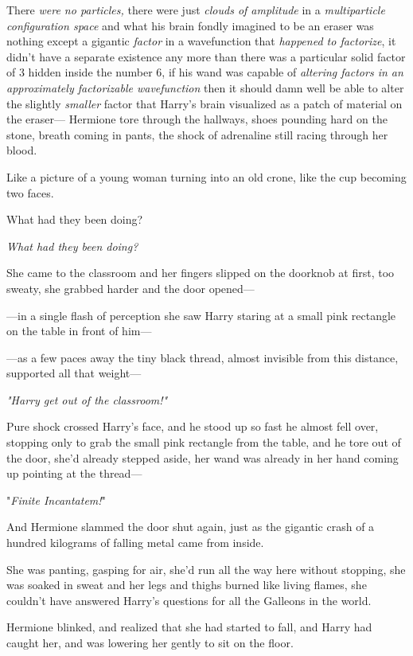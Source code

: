 There\emph{ were no particles,} there were just \emph{clouds of amplitude} in a 
\emph{multiparticle configuration space} and what his brain fondly imagined to 
be an eraser was nothing except a gigantic \emph{factor} in a wavefunction that 
\emph{happened to factorize}, it didn't have a separate existence any more than 
there was a particular solid factor of 3 hidden inside the number 6, if his 
wand was capable of \emph{altering factors in an approximately factorizable 
wavefunction} then it should damn well be able to alter the slightly 
\emph{smaller} factor that Harry's brain visualized as a patch of material on 
the eraser---
\sbreak
Hermione tore through the hallways, shoes pounding hard on the stone, breath 
coming in pants, the shock of adrenaline still racing through her blood.

Like a picture of a young woman turning into an old crone, like the cup 
becoming two faces.

What had they been doing?

\emph{What had they been doing?}

She came to the classroom and her fingers slipped on the doorknob at first, too 
sweaty, she grabbed harder and the door opened---

---in a single flash of perception she saw Harry staring at a small pink 
rectangle on the table in front of him---

---as a few paces away the tiny black thread, almost invisible from this 
distance, supported all that weight---

\emph{"Harry get out of the classroom!"}

Pure shock crossed Harry's face, and he stood up so fast he almost fell over, 
stopping only to grab the small pink rectangle from the table, and he tore out 
of the door, she'd already stepped aside, her wand was already in her hand 
coming up pointing at the thread---

"\emph{Finite Incantatem!}"

And Hermione slammed the door shut again, just as the gigantic crash of a 
hundred kilograms of falling metal came from inside.

She was panting, gasping for air, she'd run all the way here without stopping, 
she was soaked in sweat and her legs and thighs burned like living flames, she 
couldn't have answered Harry's questions for all the Galleons in the world.

Hermione blinked, and realized that she had started to fall, and Harry had 
caught her, and was lowering her gently to sit on the floor.


